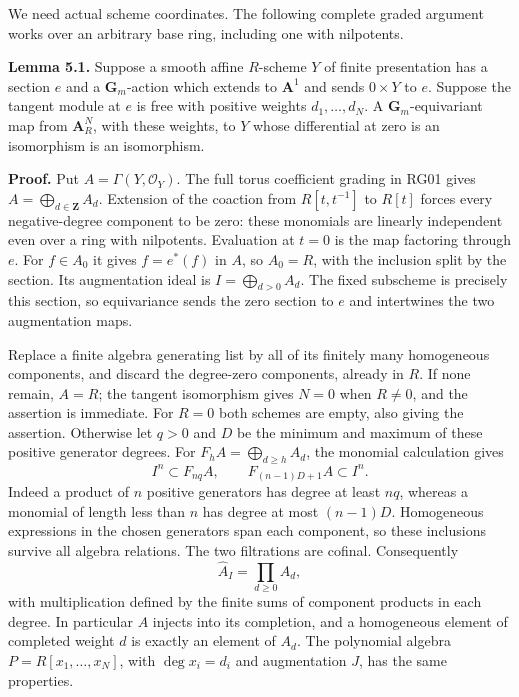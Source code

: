 \documentclass[11pt,a4paper,openany]{report}
\newcounter{none}
\begin{document}
We need actual scheme coordinates. The following complete graded argument works over an arbitrary base ring, including one with nilpotents.

\textbf{Lemma 5.1.} Suppose a smooth affine \(R\)-scheme \(Y\) of finite presentation has a section \(e\) and a \(\mathbf G_m\)-action which extends to \(\mathbf A^1\) and sends \(0\times Y\) to \(e\). Suppose the tangent module at \(e\) is free with positive weights \(d_1,\ldots,d_N\). A \(\mathbf G_m\)-equivariant map from \(\mathbf A_R^N\), with these weights, to \(Y\) whose differential at zero is an isomorphism is an isomorphism.

\textbf{Proof.} Put \(A=\Gamma(Y,\mathcal O_Y)\). The full torus coefficient grading in RG01 gives \(A=\bigoplus_{d\in\mathbf Z}A_d\). Extension of the coaction from \(R[t,t^{-1}]\) to \(R[t]\) forces every negative-degree component to be zero: these monomials are linearly independent even over a ring with nilpotents. Evaluation at \(t=0\) is the map factoring through \(e\). For \(f\in A_0\) it gives \(f=e^*(f)\) in \(A\), so \(A_0=R\), with the inclusion split by the section. Its augmentation ideal is \(I=\bigoplus_{d>0}A_d\). The fixed subscheme is precisely this section, so equivariance sends the zero section to \(e\) and intertwines the two augmentation maps.

Replace a finite algebra generating list by all of its finitely many homogeneous components, and discard the degree-zero components, already in \(R\). If none remain, \(A=R\); the tangent isomorphism gives \(N=0\) when \(R\ne0\), and the assertion is immediate. For \(R=0\) both schemes are empty, also giving the assertion. Otherwise let \(q>0\) and \(D\) be the minimum and maximum of these positive generator degrees. For \(F_hA=\bigoplus_{d\ge h}A_d\), the monomial calculation gives \[
           I^n\subset F_{nq}A,\qquad
           F_{(n-1)D+1}A\subset I^n.
\] Indeed a product of \(n\) positive generators has degree at least \(nq\), whereas a monomial of length less than \(n\) has degree at most \((n-1)D\). Homogeneous expressions in the chosen generators span each component, so these inclusions survive all algebra relations. The two filtrations are cofinal. Consequently \[
                 \widehat A_I=\prod_{d\ge0}A_d,
\] with multiplication defined by the finite sums of component products in each degree. In particular \(A\) injects into its completion, and a homogeneous element of completed weight \(d\) is exactly an element of \(A_d\). The polynomial algebra \(P=R[x_1,\ldots,x_N]\), with \(\deg x_i=d_i\) and augmentation \(J\), has the same properties.
\end{document}
